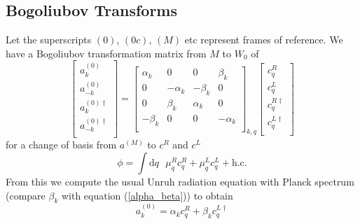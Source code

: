 \documentclass[12pt,a4paper]{article}
\newcommand{\dv}[1]{\mathrm{d} #1 \text{ }}
\begin{document}
\subsection{Bogoliubov Transforms}
Let the superscripts $(0)$, $(0c)$, $(M)$ etc represent frames of reference. We have a Bogoliubov transformation matrix from $M$ to $W_0$ of
\begin{equation}
  \left[ \begin{array}{l}
    a^{(0)}_k \\
    a^{(0)}_{-k} \\
    \hline
    a^{(0)\dagger}_k \\
    a^{(0)\dagger}_{-k} \\
 \end{array} \right] = 
  \left[
\begin{array}{rr|rr}
    \alpha_k &       0   &  0       & \beta_k \\
    0        & -\alpha_k & -\beta_k & 0 \\
    \hline
    0        & \beta_k   & \alpha_k & 0 \\
    -\beta_k &    0      &   0      & -\alpha_k \\
\end{array} \right]_{k,q}
\left[ \begin{array}{l}
    c^R_q \\
    c^L_q \\
    \hline
    c^{R\dagger}_q \\
    c^{L\dagger}_q \\
 \end{array} \right]
\end{equation}
for a change of basis from $a^{(M)}$ to $c^R$ and $c^L$
\begin{equation}
  \phi = \int \dv{q} \mu_q^R c_q^R + \mu_q^L c_q^L + \text{h.c.}
  \label{c_ladder}
\end{equation}
From this we compute the usual Unruh radiation equation with Planck spectrum (compare $\beta_k$ with equation (\ref{alpha_beta})) to obtain
\begin{equation}
  a_k^{(0)} = \alpha_k c_q^R + \beta_k c_q^{L\dagger}
\label{a_in_c}
\end{equation}
\end{document}
